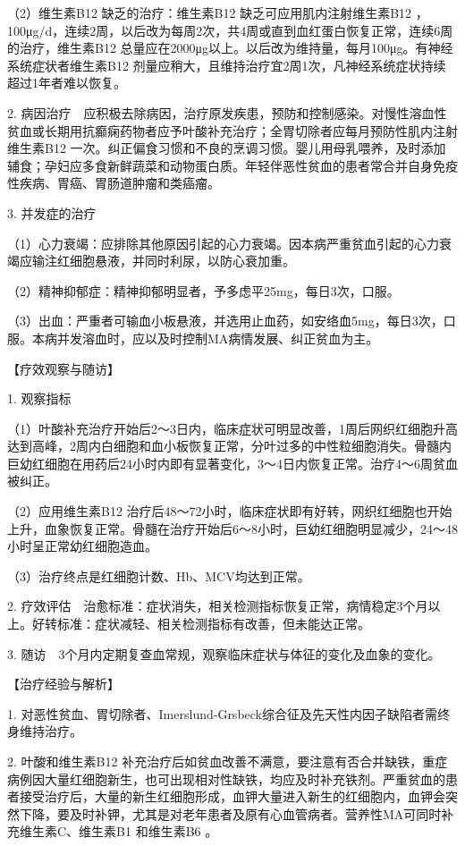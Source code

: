 （2）维生素B{12} 缺乏的治疗：维生素B{12} 缺乏可应用肌内注射维生素B{12}
，100μg/d，连续2周，以后改为每周2次，共4周或直到血红蛋白恢复正常，连续6周的治疗，维生素B{12}
总量应在2000μg以上。以后改为维持量，每月100μg。有神经系统症状者维生素B{12}
剂量应稍大，且维持治疗宜2周1次，凡神经系统症状持续超过1年者难以恢复。

2.
病因治疗　应积极去除病因，治疗原发疾患，预防和控制感染。对慢性溶血性贫血或长期用抗癫痫药物者应予叶酸补充治疗；全胃切除者应每月预防性肌内注射维生素B{12}
一次。纠正偏食习惯和不良的烹调习惯。婴儿用母乳喂养，及时添加辅食；孕妇应多食新鲜蔬菜和动物蛋白质。年轻伴恶性贫血的患者常合并自身免疫性疾病、胃癌、胃肠道肿瘤和类癌瘤。

3. 并发症的治疗

（1）心力衰竭：应排除其他原因引起的心力衰竭。因本病严重贫血引起的心力衰竭应输注红细胞悬液，并同时利尿，以防心衰加重。

（2）精神抑郁症：精神抑郁明显者，予多虑平25mg，每日3次，口服。

（3）出血：严重者可输血小板悬液，并选用止血药，如安络血5mg，每日3次，口服。本病并发溶血时，应以及时控制MA病情发展、纠正贫血为主。

【疗效观察与随访】

1. 观察指标

（1）叶酸补充治疗开始后2～3日内，临床症状可明显改善，1周后网织红细胞升高达到高峰，2周内白细胞和血小板恢复正常，分叶过多的中性粒细胞消失。骨髓内巨幼红细胞在用药后24小时内即有显著变化，3～4日内恢复正常。治疗4～6周贫血被纠正。

（2）应用维生素B{12}
治疗后48～72小时，临床症状即有好转，网织红细胞也开始上升，血象恢复正常。骨髓在治疗开始后6～8小时，巨幼红细胞明显减少，24～48小时呈正常幼红细胞造血。

（3）治疗终点是红细胞计数、Hb、MCV均达到正常。

2.
疗效评估　治愈标准：症状消失，相关检测指标恢复正常，病情稳定3个月以上。好转标准：症状减轻、相关检测指标有改善，但未能达正常。

3. 随访　3个月内定期复查血常规，观察临床症状与体征的变化及血象的变化。

【治疗经验与解析】

1.
对恶性贫血、胃切除者、Imerslund-Grsbeck综合征及先天性内因子缺陷者需终身维持治疗。

2. 叶酸和维生素B{12}
补充治疗后如贫血改善不满意，要注意有否合并缺铁，重症病例因大量红细胞新生，也可出现相对性缺铁，均应及时补充铁剂。严重贫血的患者接受治疗后，大量的新生红细胞形成，血钾大量进入新生的红细胞内，血钾会突然下降，要及时补钾，尤其是对老年患者及原有心血管病者。营养性MA可同时补充维生素C、维生素B{1}
和维生素B{6} 。

